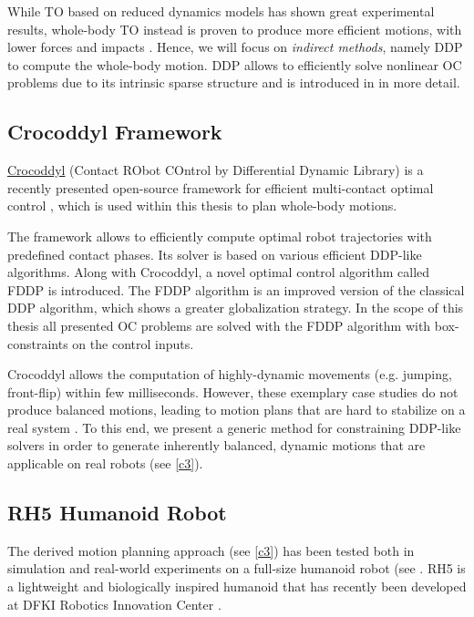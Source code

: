 While \gls{TO} based on reduced dynamics models has shown great experimental results, whole-body \gls{TO} instead is proven to produce more efficient motions, with lower forces and impacts \cite{budhiraja2018differential}. Hence, we will focus on \textit{indirect methods}, namely \gls{DDP} to compute the whole-body motion. \gls{DDP} allows to efficiently solve nonlinear \gls{OC} problems due to its intrinsic sparse structure and is introduced in  in more detail.

\subsection{Crocoddyl Framework} 
\href{https://github.com/loco-3d/crocoddyl#contact-robot-control-by-differential-dynamic-programming-library-crocoddyl}{Crocoddyl} (Contact RObot COntrol by Differential Dynamic Library) is a recently presented open-source framework for efficient multi-contact optimal control \cite{mastalli20crocoddyl}, which is used within this thesis to plan whole-body motions. 

The framework allows to efficiently compute optimal robot trajectories with predefined contact phases. Its solver is based on various efficient \gls{DDP}-like algorithms. Along with Crocoddyl, a novel optimal control algorithm called \gls{FDDP} is introduced. The \gls{FDDP} algorithm is an improved version of the classical \gls{DDP} algorithm, which shows a greater globalization strategy. In the scope of this thesis all presented \gls{OC} problems are solved with the \gls{FDDP} algorithm with box-constraints on the control inputs.

Crocoddyl allows the computation of highly-dynamic movements (e.g. jumping, front-flip) within few milliseconds. However, these exemplary case studies do not produce balanced motions, leading to motion plans that are hard to stabilize on a real system \cite{giraud2020motion}. To this end, we present a generic method for constraining DDP-like solvers in order to generate inherently balanced, dynamic motions that are applicable on real robots (see \cref{c3}).    

\subsection{RH5 Humanoid Robot}\label{subsec:RH5}
The derived motion planning approach (see \cref{c3}) has been tested both in simulation and real-world experiments on a full-size humanoid robot (see . RH5 is a lightweight and biologically inspired humanoid that has recently been developed at DFKI Robotics Innovation Center \cite{peters2017konstruktion}.


